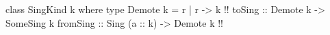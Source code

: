 \begin{code}
class SingKind k where
  type Demote k = r | r -> k !!
  toSing :: Demote k -> SomeSing k
  fromSing :: Sing (a :: k) -> Demote k  !!
\end{code}
